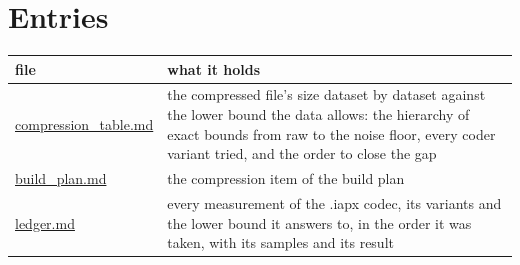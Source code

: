 \section{\texorpdfstring{Entries}{Entries}}

{\small
\setlength{\tabcolsep}{6pt}
\begin{longtable}{>{\RaggedRight\arraybackslash}p{}>{\RaggedRight\arraybackslash}p{}}
\toprule
file & what it holds \\
\midrule
\endhead
\hyperref[chap:compression-table]{compression\_\allowbreak{}table.md} & the compressed file's size dataset by dataset against the lower bound the data allows: the hierarchy of exact bounds from raw to the noise floor, every coder variant tried, and the order to close the gap \\
\hyperref[chap:build-plan]{build\_\allowbreak{}plan.md} & the compression item of the build plan \\
\hyperref[chap:ledger]{ledger.md} & every measurement of the .iapx codec, its variants and the lower bound it answers to, in the order it was taken, with its samples and its result \\
\bottomrule
\end{longtable}
}
